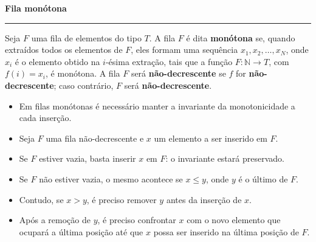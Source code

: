 \noindent
\textbf{Fila monótona}

\vspace{0.5em}
\hrule
\vspace{0.5em}

Seja $F$ uma fila de elementos do tipo $T$. A fila $F$ é dita \textbf{monótona} se, quando extraídos todos os elementos de $F$, eles formam uma sequência $x_1, x_2, \ldots, x_N$, onde $x_i$ é o elemento obtido na $i$-ésima extração, tais que a função $F : \mathbb{N} \to T$, com $f(i) = x_i$, é monótona.
A fila $F$ será \textbf{não-decrescente} se $f$ for \textbf{não-decrescente}; caso contrário, $F$ será \textbf{não-decrescente}.

\begin{itemize}
    \item Em filas monótonas é necessário manter a invariante da monotonicidade a cada inserção.
    
    \item Seja $F$ uma fila não-decrescente e $x$ um elemento a ser inserido em $F$.
    
    \item Se $F$ estiver vazia, basta inserir $x$ em $F$: o invariante estará preservado.
    
    \item Se $F$ não estiver vazia, o mesmo acontece se $x \le y$, onde $y$ é o último de $F$.
    
    \item Contudo, se $x > y$, é preciso remover $y$ antes da inserção de $x$.
    
    \item Após a remoção de $y$, é preciso confrontar $x$ com o novo elemento que ocupará a última posição até que $x$ possa ser inserido na última posição de $F$.
\end{itemize}